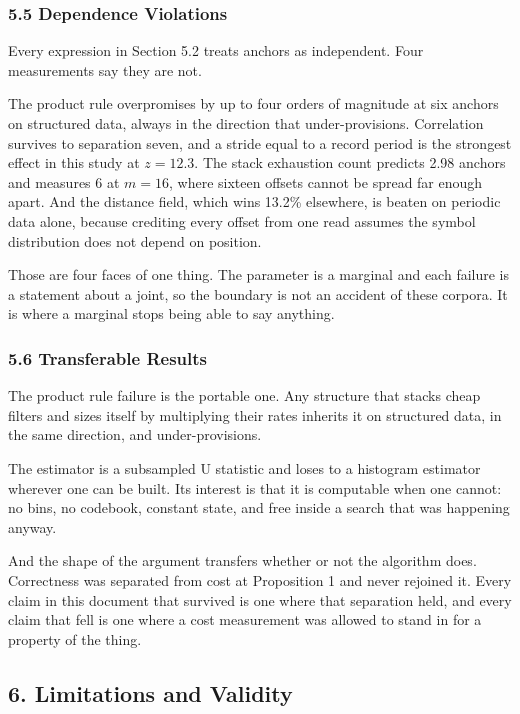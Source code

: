 \subsubsection{5.5 Dependence Violations}

Every expression in Section 5.2 treats anchors as independent. Four measurements say they are not.

The product rule overpromises by up to four orders of magnitude at six anchors on structured data, always in the direction that under-provisions. Correlation survives to separation seven, and a stride equal to a record period is the strongest effect in this study at \(z = 12.3\). The stack exhaustion count predicts 2.98 anchors and measures 6 at \(m = 16\), where sixteen offsets cannot be spread far enough apart. And the distance field, which wins 13.2\% elsewhere, is beaten on periodic data alone, because crediting every offset from one read assumes the symbol distribution does not depend on position.

Those are four faces of one thing. The parameter is a marginal and each failure is a statement about a joint, so the boundary is not an accident of these corpora. It is where a marginal stops being able to say anything.

\subsubsection{5.6 Transferable Results}

The product rule failure is the portable one. Any structure that stacks cheap filters and sizes itself by multiplying their rates inherits it on structured data, in the same direction, and under-provisions.

The estimator is a subsampled U statistic and loses to a histogram estimator wherever one can be built. Its interest is that it is computable when one cannot: no bins, no codebook, constant state, and free inside a search that was happening anyway.

And the shape of the argument transfers whether or not the algorithm does. Correctness was separated from cost at Proposition 1 and never rejoined it. Every claim in this document that survived is one where that separation held, and every claim that fell is one where a cost measurement was allowed to stand in for a property of the thing.

\subsection{6. Limitations and Validity}

